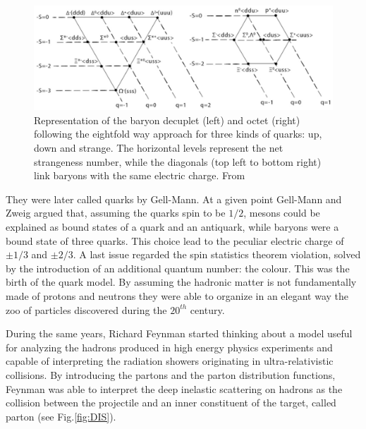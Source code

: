 \begin{figure}[!ht]
\begin{center}
\includegraphics[width=0.8\linewidth]{Chapters/Introduction/Figs/eightfold_way.pdf}
\caption{Representation of the baryon decuplet (left) and octet (right) following the eightfold way approach for three kinds of quarks: up, down and strange. The horizontal levels represent the net strangeness number, while the diagonals (top left to bottom right) link baryons with the same electric charge. From \cite{Akash:2015}}
\label{fig:gelmann}
\end{center}
\end{figure}

They were later called quarks by Gell-Mann.
At a given point Gell-Mann and Zweig argued that, assuming the quarks spin to be $1/2$, mesons could be explained as bound states of a quark and an antiquark, while baryons were a bound state of three quarks.
This choice lead to the peculiar electric charge of $\pm1/3$ and $\pm2/3$.
A last issue regarded the spin statistics theorem violation, solved by the introduction of an additional quantum number: the colour.
This was the birth of the quark model.
By assuming the hadronic matter is not fundamentally made of protons and neutrons they were able to organize in an elegant way the zoo of particles discovered during the $20^{th}$ century.

During the same years, Richard Feynman started thinking about a model useful for analyzing the hadrons produced in high energy physics experiments and capable of interpreting the radiation showers originating in ultra-relativistic collisions.
By introducing the partons and the parton distribution functions, Feynman was able to interpret the deep inelastic scattering on hadrons as the collision between the projectile and an inner constituent of the target, called parton (see Fig.\ref{fig:DIS}).

